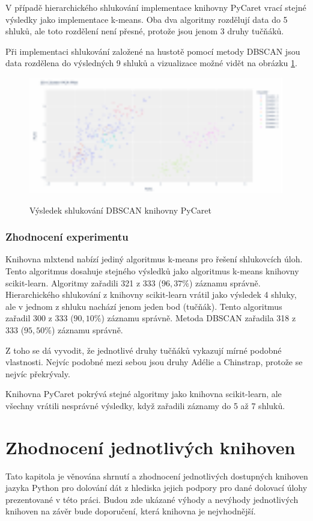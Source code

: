 V případě hierarchického shlukování implementace knihovny PyCaret vrací stejné výsledky
jako implementace k-means. Oba dva algoritmy rozdělují data do 5 shluků, ale toto rozdělení není přesné, protože jsou jenom 3 druhy tučňáků. 

Při implementaci shlukování založené na hustotě pomocí metody DBSCAN jsou data rozdělena do výsledných 9 shluků a vizualizace možné vidět na obrázku \ref{dbscanpycaretclusters}.

\begin{figure}[h]\centering
  \centering
  \includegraphics[width=\linewidth,height=2.0in]{obrazky/dbscanpycaret.pdf}\\[1pt]
  \caption{Výsledek shlukování DBSCAN knihovny PyCaret}
  \label{dbscanpycaretclusters}
\end{figure}

\subsection*{Zhodnocení experimentu}
Knihovna mlxtend nabízí jediný algoritmus k-means pro řešení shlukovcích úloh. Tento algoritmus dosahuje stejného výsledků jako algoritmus k-means knihovny scikit-learn. Algoritmy zařadili 321 z 333 ($ 96,37 \%$) záznamu správně. Hierarchického shlukování z knihovny scikit-learn vrátil jako výsledek 4 shluky, ale v jednom z shluku nachází jenom jeden bod (tučňák). Tento algoritmus zařadil 300 z 333 ($ 90,10 \%$) záznamu správně. Metoda DBSCAN zařadila 318 z 333 ($ 95,50 \%$) záznamu správně.

Z toho se dá vyvodit, že jednotlivé druhy tučňáků vykazují mírné podobné vlastnosti. Nejvíc podobné mezi sebou jsou druhy Adélie a Chinstrap, protože se nejvíc překrývaly. 

Knihovna PyCaret pokrývá stejné algoritmy jako knihovna scikit-learn, ale všechny vrátili nesprávné výsledky, když zařadili záznamy do 5 až 7 shluků.

\chapter{Zhodnocení jednotlivých knihoven}
\label{zhodnoceni}
Tato kapitola je věnována shrnutí a zhodnocení jednotlivých dostupných knihoven jazyka Python pro dolování dát z hlediska jejich podpory pro dané dolovací úlohy prezentované v této práci. Budou zde ukázané výhody a nevýhody jednotlivých knihoven na závěr bude doporučení, která knihovna je nejvhodnější.

